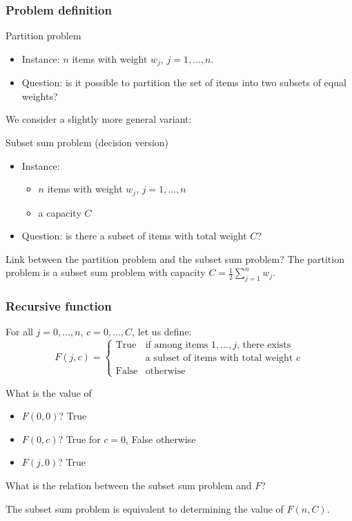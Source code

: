 \documentclass{beamer}
\begin{document}
\begin{frame}
  \frametitle{Problem definition}

  \begin{block}{Partition problem}
    \begin{itemize}
      \item Instance: $n$ items with weight \alert{$w_j$}, $j = 1, \dots, n$.
      \item Question: is it possible to partition the set of items into two subsets of equal weights?
    \end{itemize}
  \end{block}

  \pause

  We consider a slightly more general variant:
  \begin{block}{Subset sum problem (decision version)}
    \begin{itemize}
      \item Instance:
        \begin{itemize}
          \item $n$ items with weight \alert{$w_j$}, $j = 1, \dots, n$
          \item a capacity \alert{$C$}
        \end{itemize}
      \item Question: is there a subset of items with total weight $C$?
    \end{itemize}
  \end{block}

  \pause
  Link between the partition problem and the subset sum problem?
  \pause
  The partition problem is a subset sum problem with capacity $C = \frac{1}{2} \sum_{j = 1}^n w_j$.
\end{frame}

\begin{frame}
  \frametitle{Recursive function}

  For all $j = 0, \dots, n$, $c = 0, \dots, C$, let us define:
  \begin{displaymath}
    F(j, c) =
    \left\{
      \begin{array}{ll}
        \text{True} & \text{if among items $1, \dots, j$, there exists} \\
        & \text{a subset of items with total weight $c$} \\
        \text{False} & \text{otherwise}
      \end{array}
    \right.
  \end{displaymath}

  \pause
  What is the value of
  \begin{itemize}
    \item $F(0, 0)$? \pause True \pause
    \item $F(0, c)$? \pause True for $c = 0$, False otherwise \pause
    \item $F(j, 0)$? \pause True \pause
  \end{itemize}

  What is the relation between the subset sum problem and $F$? \pause

  The subset sum problem is equivalent to determining the value of $F(n, C)$.
\end{frame}
\end{document}
